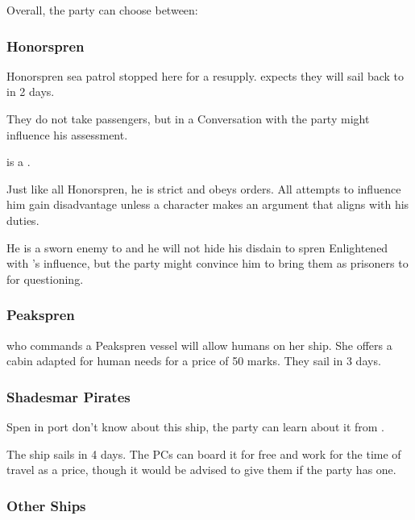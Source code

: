 Overall, the party can choose between:

\subsubsection{Honorspren}

Honorspren sea patrol stopped here for a resupply. \npcHonorsprenCaptain{} expects they will sail back to \locationFidelity{} in 2 days.

They do not take passengers, but in a Conversation with \npcHonorsprenCaptain{} the party might influence his assessment.

\npcHonorsprenCaptain{} is a \enemySprenCaptain{}. 

Just like all Honorspren, he is strict and obeys orders. All attempts to influence him gain disadvantage unless a character makes an argument that aligns with his duties. 

He is a sworn enemy to \npcOdium{} and he will not hide his disdain to spren Enlightened with \npcOdium{}'s influence, but the party might convince him to bring them as prisoners to \locationFidelity{} for questioning.


\subsubsection{Peakspren}

\npcPeaksprenCaptain{} who commands a Peakspren vessel will allow humans on her ship. She offers a cabin adapted for human needs for a price of 50 marks. They sail in 3 days.

\subsubsection{Shadesmar Pirates}

Spen in port don't know about this ship, the party can learn about it from . 

The ship sails in 4 days. The PCs can board it for free and work for the time of travel as a price, though it would be advised to give them \lootScadrialCoin{} if the party has one.

\subsubsection{Other Ships}

